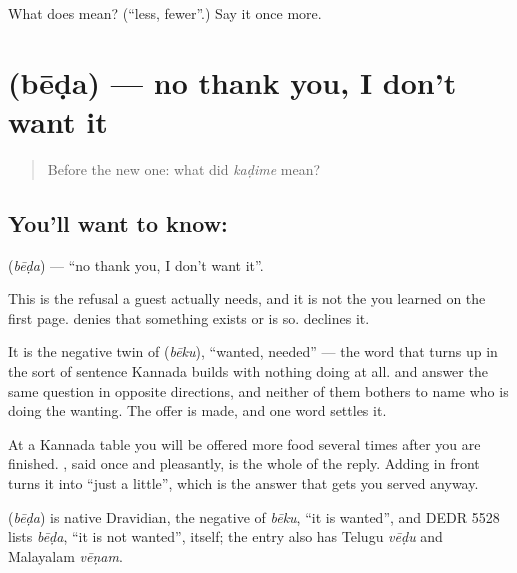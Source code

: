 \begin{tcolorbox}[breakable,colback=teal!4,colframe=teal!35!black,title={Before you move on}]
What does  mean? (\textquotedblleft{}less, fewer\textquotedblright{}.) Say it once more.
\end{tcolorbox}
\section[\texorpdfstring{\kn{ಬೇಡ} (bēḍa)}{ಬೇಡ (bēḍa)}]{ (bēḍa) — no thank you, I don't want it}

\label{lesson:KA-C58-no-thanks}



\begin{quote}
Before the new one: what did \emph{kaḍime} mean?
\end{quote}

\subsection*{You'll want to know: }
\textbf{} (\emph{bēḍa}) — \textquotedblleft{}no thank you, I don't want it\textquotedblright{}.

This is the refusal a guest actually needs, and it is not the  you learned on the first page.  denies that something exists or is so.  declines it.

It is the negative twin of  (\emph{bēku}), \textquotedblleft{}wanted, needed\textquotedblright{} — the word that turns up in the sort of sentence Kannada builds with nothing doing at all.  and  answer the same question in opposite directions, and neither of them bothers to name who is doing the wanting. The offer is made, and one word settles it.

At a Kannada table you will be offered more food several times after you are finished. , said once and pleasantly, is the whole of the reply. Adding  in front turns it into \textquotedblleft{}just a little\textquotedblright{}, which is the answer that gets you served anyway.

\begin{cousinweb}
\textbf{} (\emph{bēḍa}) is native Dravidian, the negative of \emph{bēku}, \textquotedblleft{}it is wanted\textquotedblright{}, and DEDR 5528 lists \emph{bēḍa}, \textquotedblleft{}it is not wanted\textquotedblright{}, itself; the entry also has Telugu \emph{vēḍu} and Malayalam \emph{vēṇam}.
\end{cousinweb}

